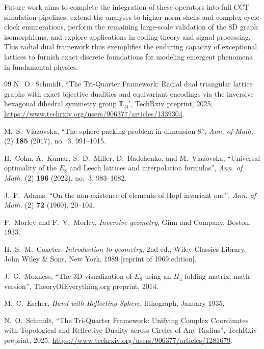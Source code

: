 \documentclass{article}
\begin{document}
Future work aims to complete the integration of these operators into full CCT simulation pipelines, extend the analyses to higher-norm shells and complex cycle clock enumerations, perform the remaining large-scale validation of the 8D graph isomorphisms, and explore applications in coding theory and signal processing. This radial dual framework thus exemplifies the enduring capacity of exceptional lattices to furnish exact discrete foundations for modeling emergent phenomena in fundamental physics.

\newpage

\begin{thebibliography}{99}
N.~O.~Schmidt,
``The Tri-Quarter Framework: Radial dual triangular lattice graphs with exact bijective dualities and equivariant encodings via the inversive hexagonal dihedral symmetry group $\mathbb{T}_{24}$',
TechRxiv preprint, 2025,
\url{https://www.techrxiv.org/users/906377/articles/1339304}.

M.~S.~Viazovska,
``The sphere packing problem in dimension 8'',
\emph{Ann. of Math.} (2) \textbf{185} (2017), no.~3, 991--1015.

H.~Cohn, A.~Kumar, S.~D.~Miller, D.~Radchenko, and M.~Viazovska,
``Universal optimality of the $E_8$ and Leech lattices and interpolation formulas'',
\emph{Ann. of Math.} (2) \textbf{196} (2022), no.~3, 983--1082.

J.~F.~Adams,
``On the non-existence of elements of Hopf invariant one'',
\emph{Ann. of Math.} (2) \textbf{72} (1960), 20--104.

F.~Morley and F.~V.~Morley,
\emph{Inversive geometry},
Ginn and Company, Boston, 1933.

H.~S.~M.~Coxeter,
\emph{Introduction to geometry},
2nd ed., Wiley Classics Library,
John Wiley \& Sons, New York, 1989 [reprint of 1969 edition].

J.~G.~Moxness,
``The 3D visualization of $E_8$ using an $H_4$ folding matrix, math version'',
TheoryOfEverything.org preprint, 2014.

M.~C.~Escher,
\emph{Hand with Reflecting Sphere},
lithograph, January 1935.

N.~O.~Schmidt,
``The Tri-Quarter Framework: Unifying Complex Coordinates with Topological and Reflective Duality across Circles of Any Radius'',
TechRxiv preprint, 2025,
\url{https://www.techrxiv.org/users/906377/articles/1281679}.


\end{thebibliography}
\end{document}
